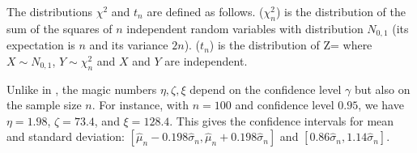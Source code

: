 The distributions $\chi^2$ and $t_n$  are defined as follows.
 ($\chi^2_n$) is the
distribution of the sum of the squares of $n$ independent
random variables with distribution $N_{0,1}$ (its expectation
is $n$ and its variance $2n$). 
($t_n$) is the distribution of
    \ben
    Z=
    \een
    where $X \sim N_{0,1}$, $Y \sim \chi^2_n$ and $X$ and $Y$ are
    independent.

Unlike in , the magic numbers
$\eta, \zeta, \xi$ depend on the confidence level
$\gamma$ but also on the sample size $n$. For
instance, with $n=100$ and confidence level
$0.95$, we have $\eta=1.98$, $\zeta=73.4$, and
$\xi=128.4$. This gives the confidence intervals
for mean and standard deviation: $[\hat{\mu}_n-
0.198 \hat{\sigma}_n, \hat{\mu}_n+ 0.198
\hat{\sigma}_n]$ and
$[0.86\hat{\sigma}_n,1.14\hat{\sigma}_n]$.




